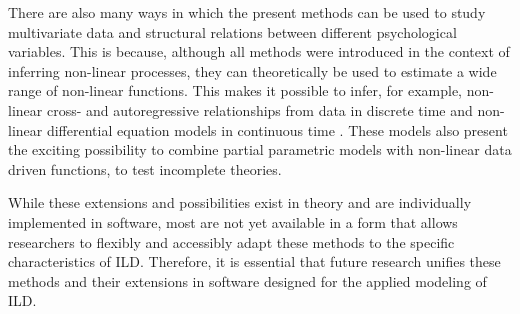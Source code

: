 \documentclass[man, floatsintext]{apa7}
\begin{document}
There are also many ways in which the present methods can be used to study
multivariate data and structural relations between different psychological
variables. This is because, although all methods were introduced in the context
of inferring non-linear processes, they can theoretically be used to estimate a
wide range of non-linear functions. This makes it possible to infer, for
example, non-linear cross- and autoregressive relationships from data in
discrete time \parencite{bringmann_modeling_2015, wood_generalized_2006,
  rasmussen_gaussian_2006, eleftheriadis_identification_2017} and non-linear
differential equation models in continuous time
\parencite{yildiz_learning_2018}. These models also present the exciting
possibility to combine partial parametric models with non-linear data driven
functions, to test incomplete theories.

While these extensions and possibilities exist in theory and are individually
implemented in software, most are not yet available in a form that allows
researchers to flexibly and accessibly adapt these methods to the specific
characteristics of ILD\@. Therefore, it is essential that future research
unifies these methods and their extensions in software designed for the applied
modeling of ILD\@.

\printbibliography[]
\end{document}
